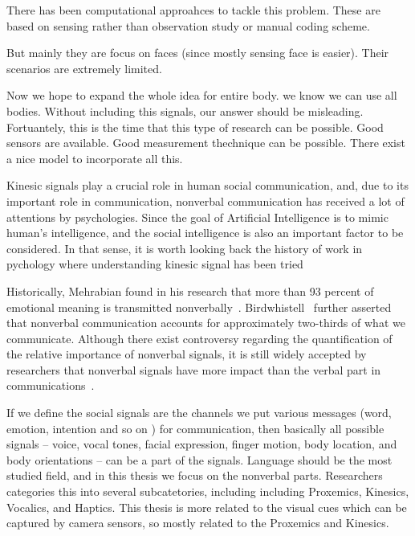 There has been computational approahces to tackle this problem. These are based on sensing rather than observation study or manual coding scheme. 



But mainly they are focus on faces (since mostly sensing face is easier). Their scenarios are extremely limited. 





Now we hope to expand the whole idea for entire body. we know we can use all bodies. Without including this signals, our answer should be misleading. Fortuantely, this is the time that this type of research can be possible. Good sensors are available. Good measurement thechnique can be possible. There exist a nice model to incorporate all this.  


















Kinesic signals play a crucial role in human social communication, and, due to its important role in communication, nonverbal communication has received a lot of attentions by psychologies.  Since the goal of Artificial Intelligence is to mimic human's intelligence, and the social intelligence is also an important factor to be considered. In that sense, it is worth looking back the history of work in pychology where understanding kinesic signal has been tried 








Historically, Mehrabian found in his research that more than 93 percent of emotional meaning is transmitted nonverbally~\cite{Mehrabian67,Mehrabian81}. Birdwhistell~\cite{Birdwhistell70} further asserted that nonverbal communication accounts for approximately two-thirds of what we communicate. Although there exist controversy regarding the quantification of the relative importance of nonverbal signals, it is still widely accepted by researchers that nonverbal signals have more impact than the verbal part in communications~\cite{Moore13}.





If we define the social signals are the channels we put various messages (word, emotion, intention and so on ) for communication, then basically all possible signals -- voice, vocal tones, facial expression, finger motion, body location, and body orientations -- can be a part of the signals.   Language should be the most studied field, and in this thesis we focus on the nonverbal parts. Researchers categories this into several subcatetories, including including Proxemics, Kinesics, Vocalics, and Haptics. This thesis is more related to the visual cues which can be captured by camera sensors, so mostly related to the Proxemics and Kinesics. 

